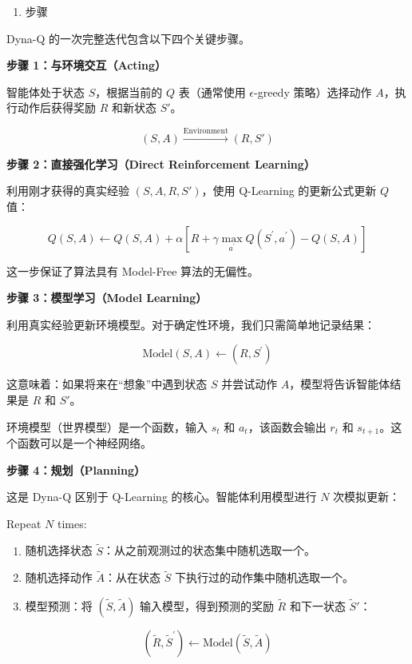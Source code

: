 \begin{enumerate}
\def\labelenumi{\arabic{enumi}.}
\tightlist
\item
  步骤
\end{enumerate}

Dyna-Q 的一次完整迭代包含以下四个关键步骤。

\textbf{步骤 1：与环境交互（Acting）}

智能体处于状态 \(S\)，根据当前的 \(Q\) 表（通常使用 \(\epsilon\)-greedy 策略）选择动作 \(A\)，执行动作后获得奖励 \(R\) 和新状态 \(S'\)。

\[
(S,A)\xrightarrow{\text{Environment}}(R,S')
\]

\textbf{步骤 2：直接强化学习（Direct Reinforcement Learning）}

利用刚才获得的真实经验 \((S,A,R,S')\)，使用 Q-Learning 的更新公式更新 \(Q\) 值：

\[
Q(S,A)\leftarrow Q(S,A)+\alpha[R+\gamma\max_{a^{\prime}}Q(S^{\prime},a^{\prime})-Q(S,A)]
\]

这一步保证了算法具有 Model-Free 算法的无偏性。

\textbf{步骤 3：模型学习（Model Learning）}

利用真实经验更新环境模型。对于确定性环境，我们只需简单地记录结果：

\[
\mathrm{Model}(S,A)\leftarrow(R,S^{\prime})
\]

这意味着：如果将来在``想象''中遇到状态 \(S\) 并尝试动作 \(A\)，模型将告诉智能体结果是 \(R\) 和 \(S'\)。

环境模型（世界模型）是一个函数，输入 \(s_t\) 和 \(a_t\)，该函数会输出 \(r_t\) 和 \(s_{t+1}\)。这个函数可以是一个神经网络。

\textbf{步骤 4：规划（Planning）}

这是 Dyna-Q 区别于 Q-Learning 的核心。智能体利用模型进行 \(N\) 次模拟更新：

Repeat \(N\) times:

\begin{enumerate}
\def\labelenumi{\arabic{enumi}.}
\tightlist
\item
  随机选择状态 \(\tilde{S}\)：从之前观测过的状态集中随机选取一个。
\item
  随机选择动作 \(\tilde{A}\)：从在状态 \(\tilde{S}\) 下执行过的动作集中随机选取一个。
\item
  模型预测：将 \((\tilde{S},\tilde{A})\) 输入模型，得到预测的奖励 \(\tilde{R}\) 和下一状态 \(\tilde{S}'\)：
\end{enumerate}

\[
(\tilde{R},\tilde{S}^{\prime})\leftarrow \mathrm{Model}(\tilde{S},\tilde{A})
\]

